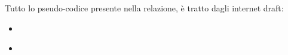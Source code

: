 Tutto lo pseudo-codice presente nella relazione, è tratto dagli internet draft:

\begin{itemize}

\item \cite{ietf:draft-cardwell-iccrg-bbr-congestion-control-00}
\item \cite{ietf:draft-cheng-iccrg-delivery-rate-estimation-00}

\end{itemize}
